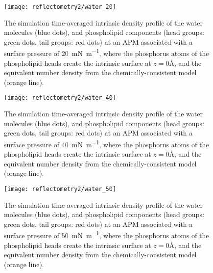 %
%
\begin{figure}
    \centering
    \texttt{[image: reflectometry2/water\_20]}
    \caption{The simulation time-averaged intrinsic density profile of the water molecules (blue dots), and phospholipid components (head groups: green dots, tail groups: red dots) at an APM associated with a surface pressure of \SI{20}{\milli\newton\per\meter}, where the phosphorus atoms of the phospholipid heads create the intrinsic surface at $z=0$\si{\angstrom}, and the equivalent number density from the chemically-consistent model (orange line).}
    \label{fig:waters}
\end{figure}
%
%
\begin{figure}
    \centering
    \texttt{[image: reflectometry2/water\_40]}
    \caption{The simulation time-averaged intrinsic density profile of the water molecules (blue dots), and phospholipid components (head groups: green dots, tail groups: red dots) at an APM associated with a surface pressure of \SI{40}{\milli\newton\per\meter}, where the phosphorus atoms of the phospholipid heads create the intrinsic surface at $z=0$\si{\angstrom}, and the equivalent number density from the chemically-consistent model (orange line).}
    \label{fig:waters}
\end{figure}
%
%
\begin{figure}
    \centering
    \texttt{[image: reflectometry2/water\_50]}
    \caption{The simulation time-averaged intrinsic density profile of the water molecules (blue dots), and phospholipid components (head groups: green dots, tail groups: red dots) at an APM associated with a surface pressure of \SI{50}{\milli\newton\per\meter}, where the phosphorus atoms of the phospholipid heads create the intrinsic surface at $z=0$\si{\angstrom}, and the equivalent number density from the chemically-consistent model (orange line).}
    \label{fig:waters}
\end{figure}
%
%
